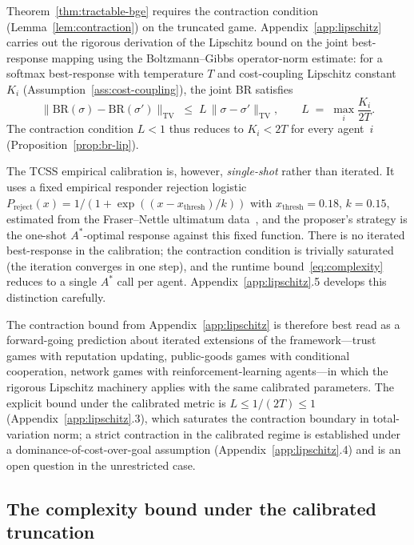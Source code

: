 \documentclass[11pt]{article}
\theoremstyle{definition}
\theoremstyle{remark}
\begin{document}
Theorem~\ref{thm:tractable-bge} requires the contraction condition (Lemma~\ref{lem:contraction}) on
the truncated game. Appendix~\ref{app:lipschitz} carries out the rigorous derivation of the
Lipschitz bound on the joint best-response mapping using the Boltzmann--Gibbs operator-norm
estimate: for a softmax best-response with temperature $T$ and cost-coupling Lipschitz constant
$K_i$ (Assumption~\ref{ass:cost-coupling}), the joint BR satisfies
\[
\bigl\| \mathrm{BR}(\sigma) - \mathrm{BR}(\sigma') \bigr\|_{\mathrm{TV}}
\;\leq\; L\,\bigl\| \sigma - \sigma' \bigr\|_{\mathrm{TV}},
\qquad L \;=\; \max_i \frac{K_i}{2T}.
\]
The contraction condition $L < 1$ thus reduces to $K_i < 2T$ for every agent~$i$
(Proposition~\ref{prop:br-lip}).

The TCSS empirical calibration is, however, \emph{single-shot} rather than iterated. It uses a fixed
empirical responder rejection logistic
$P_{\text{reject}}(x) = 1/(1 + \exp((x - x_{\text{thresh}})/k))$ with $x_{\text{thresh}} = 0.18$,
$k = 0.15$, estimated from the Fraser--Nettle ultimatum data~\cite{bond2026tcss}, and the proposer's
strategy is the one-shot $A^*$-optimal response against this fixed function. There is no iterated
best-response in the calibration; the contraction condition is trivially saturated (the iteration
converges in one step), and the runtime bound~\eqref{eq:complexity} reduces to a single $A^*$ call
per agent. Appendix~\ref{app:lipschitz}.5 develops this distinction carefully.

The contraction bound from Appendix~\ref{app:lipschitz} is therefore best read as a forward-going
prediction about iterated extensions of the framework---trust games with reputation updating,
public-goods games with conditional cooperation, network games with reinforcement-learning
agents---in which the rigorous Lipschitz machinery applies with the same calibrated parameters. The
explicit bound under the calibrated metric is
$L \leq 1/(2T) \leq 1$ (Appendix~\ref{app:lipschitz}.3), which saturates the contraction boundary
in total-variation norm; a strict contraction in the calibrated regime is established under a
dominance-of-cost-over-goal assumption (Appendix~\ref{app:lipschitz}.4) and is an open question in
the unrestricted case.

\subsection{The complexity bound under the calibrated truncation}
\end{document}
